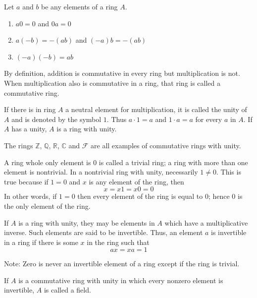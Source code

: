 \documentclass[12pt]{article}
\newcommand{\integers}{\mathds{Z}}
\newcommand{\rationals}{\mathds{Q}}
\newcommand{\reals}{\mathds{R}}
\newcommand{\complex}{\mathds{C}}
\begin{document}
\begin{theorem} Let $a$ and $b$ be any elements of a ring $A$. \begin{enumerate} 
\item $a0 = 0$ and $0a = 0$ 
\item $a(-b) = -(ab)$ and $(-a)b = -(ab)$ 
\item $(-a)(-b) = ab$ \end{enumerate} \end{theorem} 

\begin{definition} By definition, addition is commutative in every ring but multiplication is not. When multiplication also is commutative in a ring, that ring is called a commutative ring. \end{definition} 

\begin{definition} If there is in ring $A$ a neutral element for multiplication, it is called the unity of $A$ and is denoted by the symbol $1$. Thus $a \cdot 1 = a$ and $1 \cdot a = a$ for every $a$ in $A$. If $A$ has a unity, $A$ is a ring with unity. \end{definition} 

\begin{example} The rings $\integers$, $\rationals$, $\reals$, $\complex$ and $\mathcal{F}$ are all examples of commutative rings with unity. \end{example} 

\begin{definition} A ring whole only element is $0$ is called a trivial ring; a ring with more than one element is nontrivial. In a nontrivial ring with unity, necessarily $1 \neq 0$. This is true because if $1 = 0$ and $x$ is any element of the ring, then $$x = x1 = x0 = 0$$ In other words, if $1 = 0$ then every element of the ring is equal to $0$; hence $0$ is the only element of the ring. \end{definition} 

\begin{definition} If $A$ is a ring with unity, they may be elements in $A$ which have a multiplicative inverse. Such elements are said to be invertible. Thus, an element $a$ is invertible in a ring if there is some $x$ in the ring such that $$ax = xa = 1$$ \end{definition} 

Note: Zero is never an invertible element of a ring except if the ring is trivial. 

\begin{definition} If $A$ is a commutative ring with unity in which every nonzero element is invertible, $A$ is called a field. \end{definition} 
\end{document}

